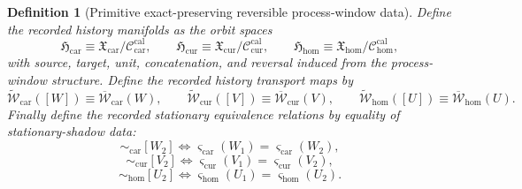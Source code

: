 \documentclass[11pt]{article}
\newcommand{\TensorHistoryClass}{\mathfrak H_{\mathrm{car}}}
\newcommand{\CurHistoryClass}{\mathfrak H_{\mathrm{cur}}}
\newcommand{\HomHistoryClass}{\mathfrak H_{\mathrm{hom}}}
\newcommand{\TensorHistoryRep}{\widetilde{\mathscr W}_{\mathrm{car}}}
\newcommand{\CurHistoryRep}{\widetilde{\mathscr W}_{\mathrm{cur}}}
\newcommand{\HomHistoryRep}{\widetilde{\mathscr W}_{\mathrm{hom}}}
\newcommand{\TensorWindowClass}{\mathfrak X_{\mathrm{car}}}
\newcommand{\CurWindowClass}{\mathfrak X_{\mathrm{cur}}}
\newcommand{\HomWindowClass}{\mathfrak X_{\mathrm{hom}}}
\newcommand{\TensorCalGroup}{\mathcal C_{\mathrm{car}}^{\mathrm{cal}}}
\newcommand{\CurCalGroup}{\mathcal C_{\mathrm{cur}}^{\mathrm{cal}}}
\newcommand{\HomCalGroup}{\mathcal C_{\mathrm{hom}}^{\mathrm{cal}}}
\newcommand{\TensorWindowRep}{\overline{\mathscr W}_{\mathrm{car}}}
\newcommand{\CurWindowRep}{\overline{\mathscr W}_{\mathrm{cur}}}
\newcommand{\HomWindowRep}{\overline{\mathscr W}_{\mathrm{hom}}}
\newcommand{\TensorStatTag}{\varsigma_{\mathrm{car}}}
\newcommand{\CurStatTag}{\varsigma_{\mathrm{cur}}}
\newcommand{\HomStatTag}{\varsigma_{\mathrm{hom}}}
\newtheorem{definition}{Definition}
\begin{document}
\begin{definition}[Primitive exact-preserving reversible process-window data]
Define the recorded history manifolds as the orbit spaces
\begin{equation}
\TensorHistoryClass\equiv\TensorWindowClass/\TensorCalGroup,\qquad
\CurHistoryClass\equiv\CurWindowClass/\CurCalGroup,\qquad
\HomHistoryClass\equiv\HomWindowClass/\HomCalGroup,
\label{eq:history_from_windows}
\end{equation}
with source, target, unit, concatenation, and reversal induced from the process-window structure. Define the recorded history transport maps by
\begin{equation}
\TensorHistoryRep([W])\equiv\TensorWindowRep(W),\qquad
\CurHistoryRep([V])\equiv\CurWindowRep(V),\qquad
\HomHistoryRep([U])\equiv\HomWindowRep(U).
\label{eq:history_transport_from_windows}
\end{equation}
Finally define the recorded stationary equivalence relations by equality of stationary-shadow data:
\begin{equation}
[W_1]\sim_{\mathrm{car}}[W_2]
\iff
\TensorStatTag(W_1)=\TensorStatTag(W_2),
\label{eq:stationary_equiv_car}
\end{equation}
\begin{equation}
[V_1]\sim_{\mathrm{cur}}[V_2]
\iff
\CurStatTag(V_1)=\CurStatTag(V_2),
\label{eq:stationary_equiv_cur}
\end{equation}
\begin{equation}
[U_1]\sim_{\mathrm{hom}}[U_2]
\iff
\HomStatTag(U_1)=\HomStatTag(U_2).
\label{eq:stationary_equiv_hom}
\end{equation}
\end{definition}
\end{document}
